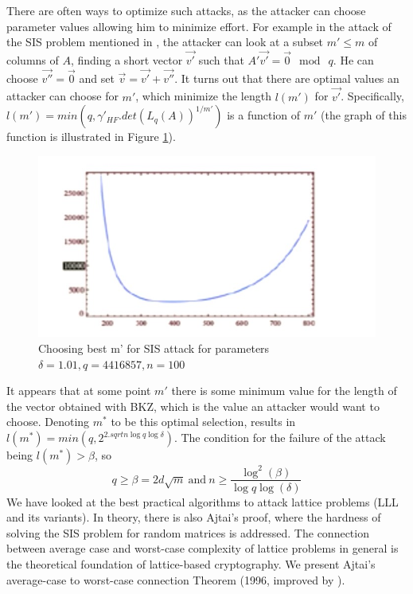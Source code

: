 There are often ways to optimize such attacks, as the attacker can choose parameter values allowing him to minimize effort. For example in the attack of the SIS problem mentioned in
\cite{micciancio2008lattice}, the attacker can look at a subset $m' \leq m$ of
columns of $A$, finding a short vector $\vec{v'}$ such that
$A'\vec{v'} = \vec{0} \mod \ q$. He can choose $\vec{v''} = \vec{0}$ and set
$\vec{v} = \vec{v'} + \vec{v''}$. It turns out that there are optimal values an attacker can choose for $m'$, which minimize the length $l(m')$ for
$\vec{v'}$.  Specifically, $l(m') = min(q,\gamma'_{HF}.det(L_q(A))^{1/m'})$ is a
function of $m'$ (the graph of this function is illustrated in Figure
\ref{fig:bestAttack}).
\begin{figure}[h]
  \centering \includegraphics[scale=0.3]{bestattack}
  \caption{Choosing best m' for SIS attack for parameters
    $\delta = 1.01, q=4416857, n=100$}
  \label{fig:bestAttack}
\end{figure}
It appears that at some point $m'$ there is some minimum value for the length of
the vector obtained with BKZ, which is the value an attacker would want to
choose. Denoting $m^*$ to be this optimal selection, results in
$l(m^*) = min(q, 2^{2.sqrt{n\log q\log \delta}})$. The condition for the failure of the attack being $l(m^*) > \beta$, so
\[
  q \geq \beta = 2d\sqrt{m} \ \text{and}\ n \geq \frac{\log^2(\beta)}{\log q
    \log(\delta)}
\]
We have looked at the best practical algorithms to attack lattice problems (LLL
and its variants). In theory, there is also Ajtai's proof, where the hardness of solving the SIS problem for random matrices is addressed. The connection between average case and  worst-case complexity of lattice problems in general is the theoretical foundation of lattice-based
cryptography. We present Ajtai's average-case to worst-case connection Theorem
(1996, improved by \cite{gentry2008trapdoors}).

